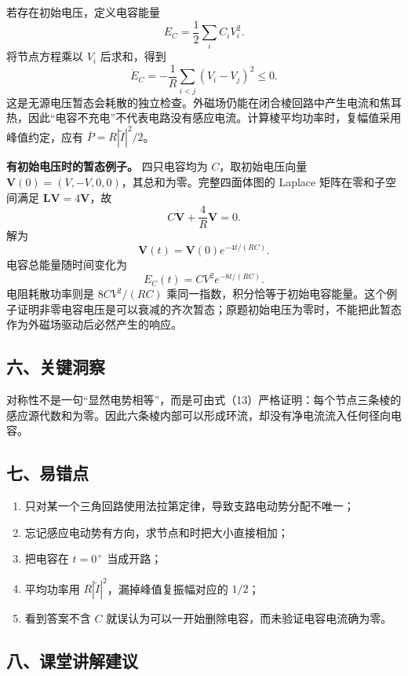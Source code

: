 \documentclass[12pt,a4paper,UTF8]{ctexart}
\newcommand{\tightlist}{\setlength{\itemsep}{0pt}\setlength{\parskip}{0pt}}
\begin{document}
若存在初始电压，定义电容能量 \[
E_C=\frac12\sum_i C_iV_i^2.
\] 将节点方程乘以 \(V_i\) 后求和，得到 \[
\dot E_C=-\frac1R\sum_{i<j}(V_i-V_j)^2\le0.
\]
这是无源电压暂态会耗散的独立检查。外磁场仍能在闭合棱回路中产生电流和焦耳热，因此``电容不充电''不代表电路没有感应电流。计算棱平均功率时，复幅值采用峰值约定，应有
\(\overline P=R|\widetilde I|^2/2\)。

\textbf{有初始电压时的暂态例子。} 四只电容均为 \(C\)，取初始电压向量
\(\bm V(0)=(V,-V,0,0)\)，其总和为零。完整四面体图的 Laplace
矩阵在零和子空间满足 \(\bm L\bm V=4\bm V\)，故 \[
C\dot{\bm V}+\frac4R\bm V=0.
\] 解为 \[
\bm V(t)=\bm V(0)e^{-4t/(RC)}.
\] 电容总能量随时间变化为 \[
E_C(t)=CV^2e^{-8t/(RC)}.
\] 电阻耗散功率则是 \(8CV^2/(RC)\)
乘同一指数，积分恰等于初始电容能量。这个例子证明非零电容电压是可以衰减的齐次暂态；原题初始电压为零时，不能把此暂态作为外磁场驱动后必然产生的响应。

\subsection{六、关键洞察}\label{ux516dux5173ux952eux6d1eux5bdf-4}

对称性不是一句``显然电势相等''，而是可由式（13）严格证明：每个节点三条棱的感应源代数和为零。因此六条棱内部可以形成环流，却没有净电流流入任何径向电容。

\subsection{七、易错点}\label{ux4e03ux6613ux9519ux70b9-4}

\begin{enumerate}
\def\labelenumi{\arabic{enumi}.}
\tightlist
\item
  只对某一个三角回路使用法拉第定律，导致支路电动势分配不唯一；
\item
  忘记感应电动势有方向，求节点和时把大小直接相加；
\item
  把电容在 \(t=0^+\) 当成开路；
\item
  平均功率用 \(R|\widetilde I|^2\)，漏掉峰值复振幅对应的 \(1/2\)；
\item
  看到答案不含 \(C\)
  就误认为可以一开始删除电容，而未验证电容电流确为零。
\end{enumerate}

\subsection{八、课堂讲解建议}\label{ux516bux8bfeux5802ux8bb2ux89e3ux5efaux8bae-4}
\end{document}
